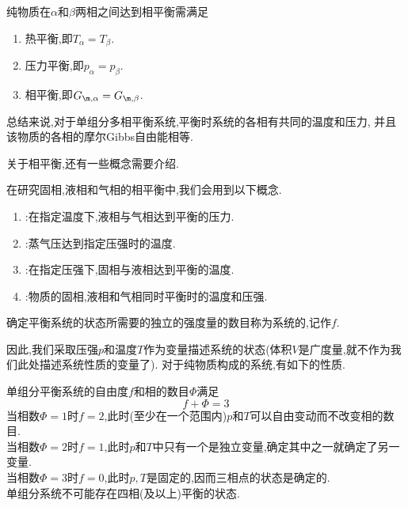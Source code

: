 \documentclass{ctexart}
\begin{document}
\begin{theorem}[4A.1.4 相平衡的条件]
    纯物质在$\alpha$和$\beta$两相之间达到相平衡需满足
    \begin{enumerate}[label=\tbf{\arabic*.}]
        \item 热平衡,即$T_\alpha=T_\beta$.
        \item 压力平衡,即$p_\alpha=p_\beta$.
        \item 相平衡,即$G_{\m,\alpha}=G_{\m,\beta}$.
    \end{enumerate}
    总结来说,对于单组分多相平衡系统,平衡时系统的各相有共同的温度和压力,%
    并且该物质的各相的摩尔Gibbs自由能\footnotemark 相等.
\end{theorem}
关于相平衡,还有一些概念需要介绍.
\begin{definition}[4A.1.5 相平衡中的概念]
    在研究固相,液相和气相的相平衡中,我们会用到以下概念.
    \begin{enumerate}[label=\tbf{\arabic*.}]
        \item {}:在指定温度下,液相与气相达到平衡的压力.
        \item {}:蒸气压达到指定压强时的温度.
        \item {}:在指定压强下,固相与液相达到平衡的温度.
        \item {}\footnotemark :物质的固相,液相和气相同时平衡时的温度和压强.
    \end{enumerate}
\end{definition}
\begin{definition}[4A.1.6 自由度]
    确定平衡系统的状态所需要的独立的强度量\footnotemark 的数目称为系统的,记作$f$.
\end{definition}
因此,我们采取压强$p$和温度$T$作为变量描述系统的状态(体积$V$是广度量,就不作为我们此处描述系统性质的变量了).%
对于纯物质构成的系统,有如下的性质.
\begin{theorem}
    单组分平衡系统的自由度$f$和相的数目$\Phi$满足
    \[f+\Phi=3\]
    当相数$\Phi=1$时$f=2$,此时(至少在一个范围内)$p$和$T$可以自由变动而不改变相的数目.\\
    当相数$\Phi=2$时$f=1$,此时$p$和$T$中只有一个是独立变量,确定其中之一就确定了另一变量.\\
    当相数$\Phi=3$时$f=0$,此时$p,T$是固定的,因而三相点的状态是确定的.\\
    单组分系统不可能存在四相(及以上)平衡的状态.
\end{theorem}
\end{document}
